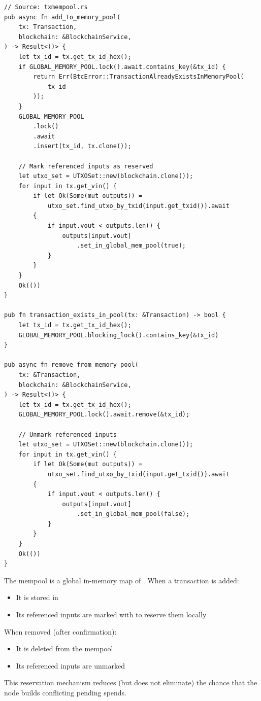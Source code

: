 \begin{listing}[htbp]
\caption{Mempool operations: add, remove, check existence}
\label{lst:ch09-5-6}
\begin{verbatim}
// Source: txmempool.rs
pub async fn add_to_memory_pool(
    tx: Transaction,
    blockchain: &BlockchainService,
) -> Result<()> {
    let tx_id = tx.get_tx_id_hex();
    if GLOBAL_MEMORY_POOL.lock().await.contains_key(&tx_id) {
        return Err(BtcError::TransactionAlreadyExistsInMemoryPool(
            tx_id
        ));
    }
    GLOBAL_MEMORY_POOL
        .lock()
        .await
        .insert(tx_id, tx.clone());

    // Mark referenced inputs as reserved
    let utxo_set = UTXOSet::new(blockchain.clone());
    for input in tx.get_vin() {
        if let Ok(Some(mut outputs)) =
            utxo_set.find_utxo_by_txid(input.get_txid()).await
        {
            if input.vout < outputs.len() {
                outputs[input.vout]
                    .set_in_global_mem_pool(true);
            }
        }
    }
    Ok(())
}

pub fn transaction_exists_in_pool(tx: &Transaction) -> bool {
    let tx_id = tx.get_tx_id_hex();
    GLOBAL_MEMORY_POOL.blocking_lock().contains_key(&tx_id)
}

pub async fn remove_from_memory_pool(
    tx: &Transaction,
    blockchain: &BlockchainService,
) -> Result<()> {
    let tx_id = tx.get_tx_id_hex();
    GLOBAL_MEMORY_POOL.lock().await.remove(&tx_id);

    // Unmark referenced inputs
    let utxo_set = UTXOSet::new(blockchain.clone());
    for input in tx.get_vin() {
        if let Ok(Some(mut outputs)) =
            utxo_set.find_utxo_by_txid(input.get_txid()).await
        {
            if input.vout < outputs.len() {
                outputs[input.vout]
                    .set_in_global_mem_pool(false);
            }
        }
    }
    Ok(())
}
\end{verbatim}
\end{listing}

\begin{notebox}
The mempool is a global in-memory map of . When a transaction is added:
\begin{itemize}
  \item It is stored in 
  \item Its referenced inputs are marked with  to reserve them locally
\end{itemize}

When removed (after confirmation):
\begin{itemize}
  \item It is deleted from the mempool
  \item Its referenced inputs are unmarked
\end{itemize}

This reservation mechanism reduces (but does not eliminate) the chance that the node builds conflicting pending spends.
\end{notebox}

